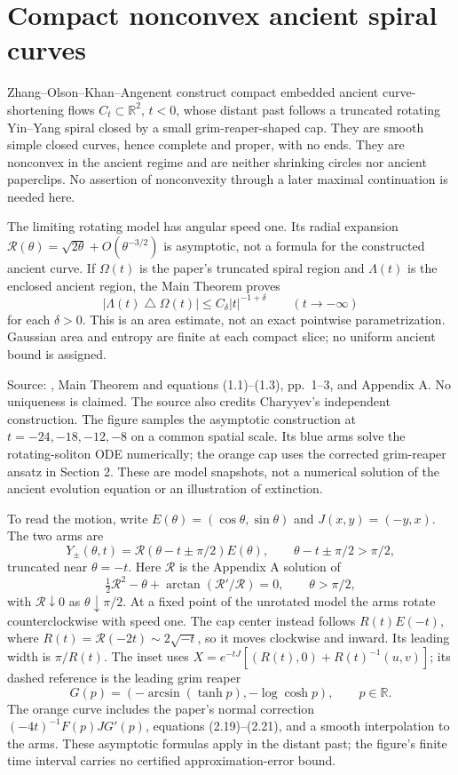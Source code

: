 \chapter{Compact nonconvex ancient spiral curves}\label{sec:catalogue-ancient-spiral-curves}
\begin{example}\label{ex:catalogue-ancient-spiral-curves}
Zhang--Olson--Khan--Angenent construct compact embedded ancient curve-shortening flows $C_t\subset\mathbb R^2$, $t<0$, whose distant past follows a truncated rotating Yin--Yang spiral closed by a small grim-reaper-shaped cap. They are smooth simple closed curves, hence complete and proper, with no ends. They are nonconvex in the ancient regime and are neither shrinking circles nor ancient paperclips. No assertion of nonconvexity through a later maximal continuation is needed here.

The limiting rotating model has angular speed one. Its radial expansion $\mathcal R(\theta)=\sqrt{2\theta}+O(\theta^{-3/2})$ is asymptotic, not a formula for the constructed ancient curve. If $\Omega(t)$ is the paper's truncated spiral region and $\Lambda(t)$ is the enclosed ancient region, the Main Theorem proves
\[
 |\Lambda(t)\mathbin{\triangle}\Omega(t)|\leq C_\delta |t|^{-1+\delta}\qquad(t\to-\infty)
\]
for each $\delta>0$. This is an area estimate, not an exact pointwise parametrization. Gaussian area and entropy are finite at each compact slice; no uniform ancient bound is assigned.

Source: \cite{CatZOKA23}, Main Theorem and equations (1.1)--(1.3), pp.~1--3, and Appendix A. No uniqueness is claimed. The source also credits Charyyev's independent construction. The figure samples the asymptotic construction at $t=-24,-18,-12,-8$ on a common spatial scale. Its blue arms solve the rotating-soliton ODE numerically; the orange cap uses the corrected grim-reaper ansatz in Section 2. These are model snapshots, not a numerical solution of the ancient evolution equation or an illustration of extinction.

To read the motion, write $E(\theta)=(\cos\theta,\sin\theta)$ and $J(x,y)=(-y,x)$. The two arms are
\[
 Y_\pm(\theta,t)=\mathcal R(\theta-t\pm\pi/2)E(\theta),
 \qquad \theta-t\pm\pi/2>\pi/2,
\]
truncated near $\theta=-t$. Here $\mathcal R$ is the Appendix A solution of
\[
 \tfrac12\mathcal R^2-\theta+\arctan(\mathcal R'/\mathcal R)=0,
 \qquad \theta>\pi/2,
\]
with $\mathcal R\downarrow0$ as $\theta\downarrow\pi/2$. At a fixed point of the unrotated model the arms rotate counterclockwise with speed one. The cap center instead follows $R(t)E(-t)$, where $R(t)=\mathcal R(-2t)\sim2\sqrt{-t}$, so it moves clockwise and inward. Its leading width is $\pi/R(t)$. The inset uses $X=e^{-tJ}[(R(t),0)+R(t)^{-1}(u,v)]$; its dashed reference is the leading grim reaper
\[
 G(p)=(-\arcsin(\tanh p),-\log\cosh p),\qquad p\in\mathbb R.
\]
The orange curve includes the paper's normal correction $(-4t)^{-1}F(p)JG'(p)$, equations (2.19)--(2.21), and a smooth interpolation to the arms. These asymptotic formulas apply in the distant past; the figure's finite time interval carries no certified approximation-error bound.
\end{example}

